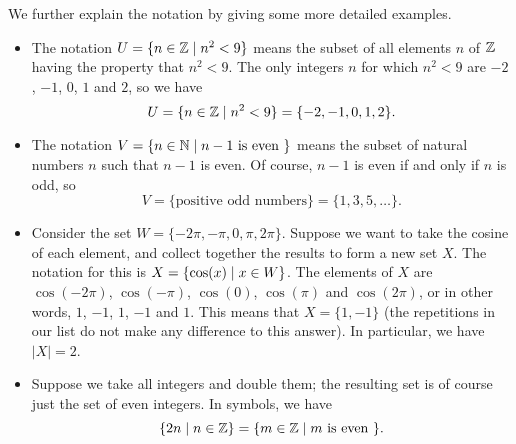 \documentclass[a4paper]{book}
\theoremstyle{definition}
\begin{document}
We further explain the notation by giving some more detailed
examples. 
\begin{itemize}
 \item The notation $U=\{n\in{\mathbb{Z}}\;|\; n^2<9\}$ means the subset of all
  elements $n$ of ${\mathbb{Z}}$ having the property that $n^2<9$.  The only
  integers $n$ for which $n^2<9$ are $-2$, $-1$, $0$, $1$ and $2$, so
  we have
  \[ U = \{n\in{\mathbb{Z}}\;|\; n^2<9\} = \{-2,-1,0,1,2\}. \]
 \item The notation $V=\{n\in{\mathbb{N}}\;|\; n-1\text{ is even }\}$ means the
  subset of natural numbers $n$ such that $n-1$ is even.  Of course,
  $n-1$ is even if and only if $n$ is odd, so
  \[ V=\{\text{positive odd numbers}\} = \{1,3,5,\ldots\}. \]
 \item Consider the set $W=\{-2\pi,-\pi,0,\pi,2\pi\}$.  Suppose we
  want to take the cosine of each element, and collect together the
  results to form a new set $X$.  The notation for this is
  $X=\{\cos(x)\;|\; x\in W\}$.  The elements of $X$ are 
  $\cos(-2\pi)$, $\cos(-\pi)$, $\cos(0)$, $\cos(\pi)$ and
  $\cos(2\pi)$, or in other words, $1$, $-1$, $1$, $-1$ and $1$.  This
  means that $X=\{1,-1\}$ (the repetitions in our list do not make any
  difference to this answer).  In particular, we have $|X|=2$.
 \item Suppose we take all integers and double them; the resulting
  set is of course just the set of even integers.  In symbols, we
  have
  \[ \{2n\;|\; n\in{\mathbb{Z}}\} = \{m\in{\mathbb{Z}}\;|\; m \text{ is even }\}. \]
\end{itemize}
\end{document}
